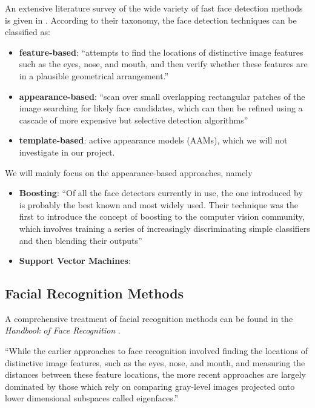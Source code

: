 \documentclass[11pt]{article} %
\theoremstyle{plain}
\theoremstyle{definition}
\theoremstyle{remark}
\numberwithin{equation}{section} %
\numberwithin{figure}{section} %
\numberwithin{table}{section} %
\begin{document}
An extensive literature survey of the wide variety of fast face detection methods is given in \citep{yang2002detecting}. According to their taxonomy,
the face detection techniques can be classified as\citep{szeliski2010computer}:

\begin{itemize}
  \item \textbf{feature-based}: ``attempts to find the locations of distinctive image features such as the eyes, nose, and mouth, and then verify whether these features are in a plausible geometrical arrangement.''
  \item \textbf{appearance-based}: ``scan over small overlapping rectangular patches of the image searching for likely face candidates, which can then be refined using a cascade of more expensive but selective detection algorithms''
  \item \textbf{template-based}: active appearance models (AAMs), which we will not investigate in our project.
\end{itemize}

We will mainly focus on the appearance-based approaches, namely

\begin{itemize}
  \item \textbf{Boosting}: ``Of all the face detectors currently in use, the one introduced by \citep{viola2004robust} is probably the best known and most widely used. Their technique was the first to introduce the concept of boosting to the computer vision community, which involves training a series of increasingly discriminating simple classifiers and then blending their outputs''
  \item \textbf{Support Vector Machines}: \citep{osuna1997training}
\end{itemize}

\subsection{Facial Recognition Methods}

A comprehensive treatment of facial recognition methods can be found in the \emph{Handbook of Face Recognition} \citep{jain2005handbook}.

``While the earlier approaches to face recognition involved finding the locations of distinctive image features, such as the eyes, nose, and mouth, and measuring the distances between these feature locations, the more recent approaches are largely dominated by those which rely on comparing gray-level images projected onto lower dimensional subspaces called eigenfaces.''
\end{document}
